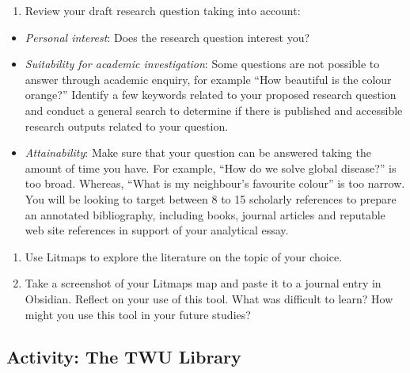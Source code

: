 \documentclass[
]{book}
\providecommand{\tightlist}{%
  \setlength{\itemsep}{0pt}\setlength{\parskip}{0pt}}
\theoremstyle{definition}
\theoremstyle{definition}
\theoremstyle{definition}
\theoremstyle{definition}
\theoremstyle{remark}
\begin{document}
\begin{reflect}
\begin{enumerate}
\def\labelenumi{\arabic{enumi}.}
\setcounter{enumi}{2}
\tightlist
\item
  Review your draft research question taking into account:\\
\end{enumerate}

\begin{itemize}
\tightlist
\item
  \emph{Personal interest}: Does the research question interest you?\\
\item
  \emph{Suitability for academic investigation}: Some questions are not possible to answer through academic enquiry, for example ``How beautiful is the colour orange?'' Identify a few keywords related to your proposed research question and conduct a general search to determine if there is published and accessible research outputs related to your question.\\
\item
  \emph{Attainability}: Make sure that your question can be answered taking the amount of time you have. For example, ``How do we solve global disease?'' is too broad. Whereas, ``What is my neighbour's favourite colour'' is too narrow. You will be looking to target between 8 to 15 scholarly references to prepare an annotated bibliography, including books, journal articles and reputable web site references in support of your analytical essay.
\end{itemize}

\begin{enumerate}
\def\labelenumi{\arabic{enumi}.}
\setcounter{enumi}{3}
\item
  Use Litmaps to explore the literature on the topic of your choice.
\item
  Take a screenshot of your Litmaps map and paste it to a journal entry in Obsidian. Reflect on your use of this tool. What was difficult to learn? How might you use this tool in your future studies?
\end{enumerate}
\end{reflect}

\hypertarget{activity-the-twu-library}{%
\subsection*{Activity: The TWU Library}\label{activity-the-twu-library}}
\end{document}
